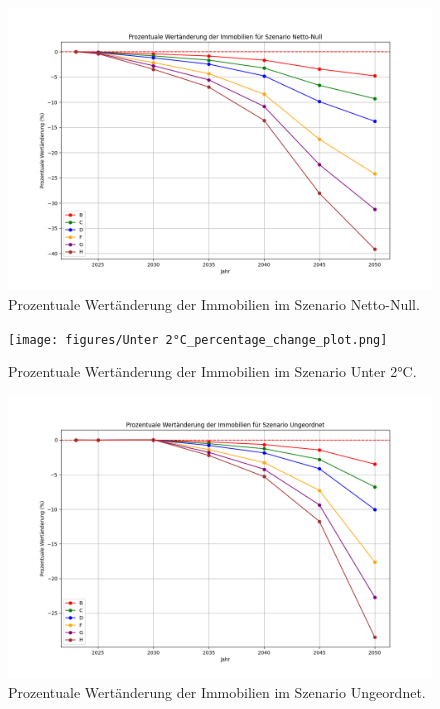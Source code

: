 \begin{figure}[H]
    \centering
    \includegraphics[width=\linewidth]{figures/Netto-Null_percentage_change_plot.png}
    \caption{Prozentuale Wertänderung der Immobilien im Szenario Netto-Null.}
    \label{fig:netto_null}
\end{figure}

\begin{figure}[H]
    \centering
    \texttt{[image: figures/Unter 2°C\_percentage\_change\_plot.png]}
    \caption{Prozentuale Wertänderung der Immobilien im Szenario Unter 2°C.}
    \label{fig:unter_2c}
\end{figure}

\begin{figure}[H]
    \centering
    \includegraphics[width=\linewidth]{figures/Ungeordnet_percentage_change_plot.png}
    \caption{Prozentuale Wertänderung der Immobilien im Szenario Ungeordnet.}
    \label{fig:ungeordnet}
\end{figure}

